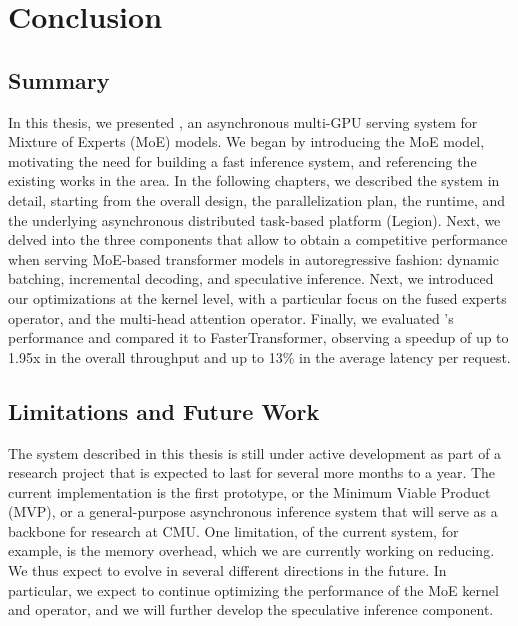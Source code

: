 
\chapter{Conclusion}\label{chapter-8}

\section{Summary}
In this thesis, we presented \Project, an asynchronous multi-GPU serving system for Mixture of Experts (MoE) models. We began by introducing the MoE model, motivating the need for building a fast inference system, and referencing the existing works in the area. In the following chapters, we described the \Project system in detail, starting from the overall design, the parallelization plan, the runtime, and the underlying asynchronous distributed task-based platform (Legion). Next, we delved into the three components that allow \Project to obtain a competitive performance when serving MoE-based transformer models in autoregressive fashion: dynamic batching, incremental decoding, and speculative inference. Next, we introduced our optimizations at the kernel level, with a particular focus on the fused experts operator, and the multi-head attention operator. Finally, we evaluated \Project's performance and compared it to FasterTransformer, observing a speedup of up to 1.95x in the overall throughput and up to 13\% in the average latency per request.

\section{Limitations and Future Work}
The system described in this thesis is still under active development as part of a research project that is expected to last for several more months to a year. The current implementation is the first prototype, or the Minimum Viable Product (MVP), or a general-purpose asynchronous inference system that will serve as a backbone for research at CMU. One limitation, of the current system, for example, is the memory overhead, which we are currently working on reducing. We thus expect \Project to evolve in several different directions in the future. In particular, we expect to continue optimizing the performance of the MoE kernel and operator, and we will further develop the speculative inference component.
